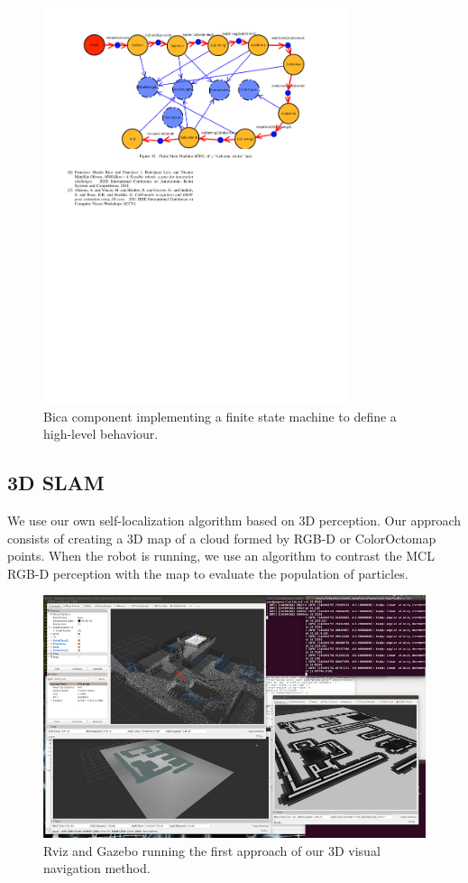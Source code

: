 \documentclass[citeauthoryear]{llncs}
\begin{document}
\begin{figure}[ht]
  \centering
  \includegraphics[width=0.8\textwidth]{202}
  \caption{Bica component implementing a finite state machine to define a high-level behaviour.} 
  \label{fig:Bicacomponent}
\end{figure}




\subsection{3D SLAM}

We use our own self-localization algorithm based on 3D perception. 
Our approach consists of creating a 3D map of a cloud formed by RGB-D or ColorOctomap \cite{hornung2013octomap} points. 
When the robot is running, we use an algorithm to contrast the MCL RGB-D perception with the map to evaluate the population of particles.
\begin{figure}[ht]
    \centering
    \includegraphics[width=.7\textwidth]{Navigation}
    \caption{Rviz and Gazebo running the first approach of our 3D visual navigation method.}
  \label{fig:navigation}
\end{figure}
\end{document}
